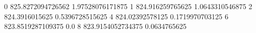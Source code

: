 0 825.8272094726562 1.97528076171875
1 824.916259765625 1.0643310546875
2 824.3916015625 0.5396728515625
4 824.02392578125 0.1719970703125
6 823.8519287109375 0.0
8 823.9154052734375 0.0634765625
